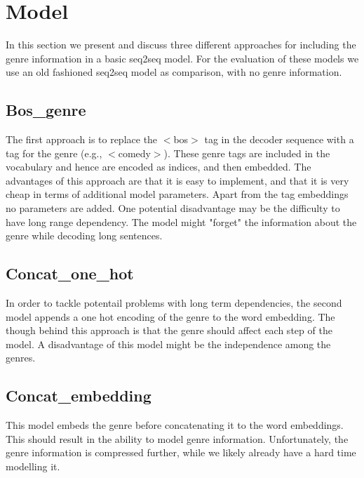 \section{Model}

In this section we present and discuss three different approaches for including the genre information in a basic seq2seq model. For the evaluation of these models we use an old fashioned seq2seq model as comparison, with no genre information.

\subsection{Bos\_genre}
\label{mod:bos}
The first approach is to replace the $<$bos$>$ tag in the decoder sequence with a tag for the genre (e.g., $<$comedy$>$). These genre tags are included in the vocabulary and hence are encoded as indices, and then embedded. The advantages of this approach are that it is easy to implement, and that it is very cheap in terms of additional model parameters. Apart from the tag embeddings no parameters are added. One potential disadvantage may be the difficulty to have long range dependency. The model might "forget" the information about the genre while decoding long sentences.

\subsection{Concat\_one\_hot}
\label{mod:onehot}
In order to tackle potentail problems with long term dependencies, the second model appends a one hot encoding of the genre to the word embedding. The though behind this approach is that the genre should affect each step of the model. A disadvantage of this model might be the independence among the genres.

\subsection{Concat\_embedding}
\label{mod:concat}
This model embeds the genre before concatenating it to the word embeddings. This should result in the ability to model genre information. Unfortunately, the genre information is compressed further, while we likely already have a hard time modelling it.
